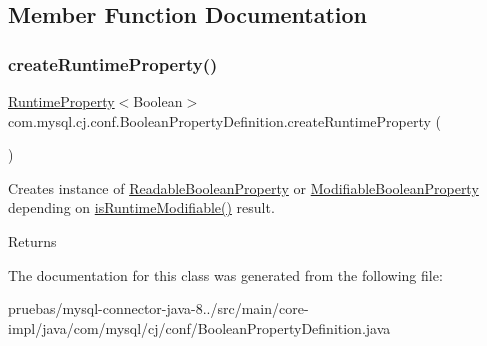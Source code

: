 \subsection{Member Function Documentation}
\mbox{\label{classcom_1_1mysql_1_1cj_1_1conf_1_1_boolean_property_definition_aeef0dd2eab9af91012ae5539eab40774}} 
\subsubsection{\texorpdfstring{create\+Runtime\+Property()}{createRuntimeProperty()}}
{\footnotesize\ttfamily \mbox{\hyperlink{interfacecom_1_1mysql_1_1cj_1_1conf_1_1_runtime_property}{Runtime\+Property}}$<$Boolean$>$ com.\+mysql.\+cj.\+conf.\+Boolean\+Property\+Definition.\+create\+Runtime\+Property (\begin{DoxyParamCaption}{ }\end{DoxyParamCaption})}

Creates instance of \mbox{\hyperlink{classcom_1_1mysql_1_1cj_1_1conf_1_1_readable_boolean_property}{Readable\+Boolean\+Property}} or \mbox{\hyperlink{classcom_1_1mysql_1_1cj_1_1conf_1_1_modifiable_boolean_property}{Modifiable\+Boolean\+Property}} depending on \mbox{\hyperlink{classcom_1_1mysql_1_1cj_1_1conf_1_1_abstract_property_definition_a6c98140b2db84ccd0ff29ce165ec9ef5}{is\+Runtime\+Modifiable()}} result.

\begin{DoxyReturn}{Returns}

\end{DoxyReturn}


The documentation for this class was generated from the following file\+:\begin{DoxyCompactItemize}
\item 
pruebas/mysql-\/connector-\/java-\/8../src/main/core-\/impl/java/com/mysql/cj/conf/Boolean\+Property\+Definition.\+java\end{DoxyCompactItemize}
